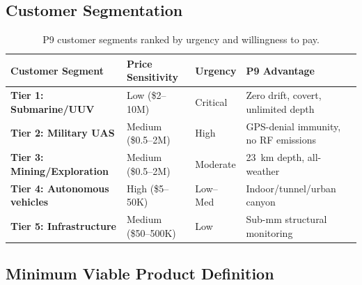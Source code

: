 \documentclass[11pt]{article}
\theoremstyle{definition}
\theoremstyle{remark}
\begin{document}
\subsection{Customer Segmentation}

\begin{table}[H]
\centering
\caption{P9 customer segments ranked by urgency and willingness to pay.}
\label{tab:customers}
\begin{tabular}{@{}p{3.5cm}p{2.5cm}p{2cm}p{4cm}@{}}
\toprule
Customer Segment & Price Sensitivity & Urgency & P9 Advantage \\
\midrule
\textbf{Tier 1: Submarine/UUV} & Low (\$2--10M) & Critical & Zero drift, covert, unlimited depth \\
\textbf{Tier 2: Military UAS} & Medium (\$0.5--2M) & High & GPS-denial immunity, no RF emissions \\
\textbf{Tier 3: Mining/Exploration} & Medium (\$0.5--2M) & Moderate & 23~km depth, all-weather \\
\textbf{Tier 4: Autonomous vehicles} & High (\$5--50K) & Low--Med & Indoor/tunnel/urban canyon \\
\textbf{Tier 5: Infrastructure} & Medium (\$50--500K) & Low & Sub-mm structural monitoring \\
\bottomrule
\end{tabular}
\end{table}

\subsection{Minimum Viable Product Definition}
\end{document}
